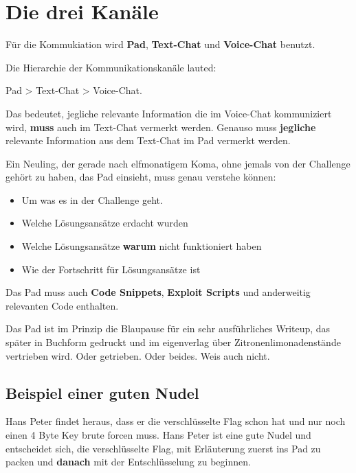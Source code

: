 \documentclass[12pt,a4paper,oneside]{book}
\theoremstyle{plain}
\numberwithin{equation}{chapter} \DeclareMathOperator{\Var}{Var}
\begin{document}
\newpage

\tableofcontents



\newpage
{}
\chapter{Die drei Kanäle}
Für die Kommukiation wird \textbf{Pad}, \textbf{Text-Chat} und \textbf{Voice-Chat} benutzt.

Die Hierarchie der Kommunikationskanäle lauted: 
\begin{center}
Pad > Text-Chat > Voice-Chat.
\end{center}

Das bedeutet, jegliche relevante Information die im Voice-Chat kommuniziert wird, \textbf{muss} auch im Text-Chat vermerkt werden.
Genauso muss \textbf{jegliche} relevante Information aus dem Text-Chat im Pad vermerkt werden.

Ein Neuling, der gerade nach elfmonatigem Koma, ohne jemals von der Challenge gehört zu haben, das Pad einsieht, muss genau verstehe können:

\begin{itemize}
\item Um was es in der Challenge geht.
\item Welche Lösungsansätze erdacht wurden
\item Welche Lösungsansätze \textbf{warum} nicht funktioniert haben
\item Wie der Fortschritt für Lösungsansätze ist
\end{itemize}

Das Pad muss auch \textbf{Code Snippets}, \textbf{Exploit Scripts} und anderweitig relevanten Code enthalten. 

Das Pad ist im Prinzip die Blaupause für ein sehr ausführliches Writeup, das später in Buchform gedruckt und im eigenverlag über Zitronenlimonadenstände vertrieben wird. Oder getrieben. Oder beides. Weis auch nicht.

\section{Beispiel einer guten Nudel}
Hans Peter findet heraus, dass er die verschlüsselte Flag schon hat und nur noch einen 4 Byte Key brute forcen muss. Hans Peter ist eine gute Nudel und entscheidet sich, die verschlüsselte Flag, mit Erläuterung zuerst ins Pad zu packen und \textbf{danach} mit der Entschlüsselung zu beginnen.
\end{document}
